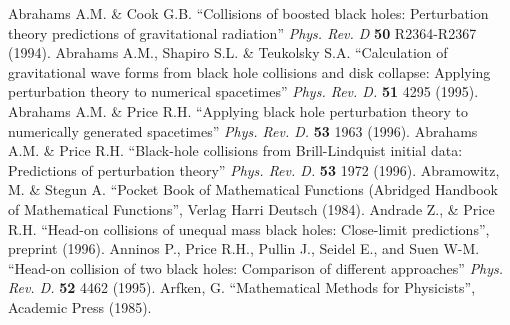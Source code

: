 \begin{thebibliography}{9}
    Abrahams A.M. \& Cook G.B. 
                        ``Collisions of boosted black holes: 
                          Perturbation theory predictions of 
                          gravitational radiation'' 
                        {\em Phys. Rev. D} 
                        {\bf 50} 
                        R2364-R2367 
                        (1994).
    Abrahams A.M., Shapiro S.L. \& Teukolsky S.A.  
                        ``Calculation of gravitational wave forms from 
                          black hole collisions and disk collapse: Applying
                          perturbation theory to numerical spacetimes''
                        {\em Phys. Rev. D.} 
                        {\bf 51}
                        4295
                        (1995).
   Abrahams A.M. \& Price R.H. 
                        ``Applying black hole perturbation
                          theory to numerically generated spacetimes'' 
                        {\em Phys. Rev. D.} 
                        {\bf 53} 
                        1963 
                        (1996).
   Abrahams A.M. \& Price R.H. 
                        ``Black-hole collisions from Brill-Lindquist 
                          initial data: Predictions of perturbation theory'' 
                        {\em Phys. Rev. D.} 
                        {\bf 53} 
                        1972 
                        (1996).
         Abramowitz, M. \& Stegun A. 
                        ``Pocket Book of Mathematical Functions 
                          (Abridged Handbook of Mathematical Functions'', 
                        Verlag Harri Deutsch 
                        (1984).
     Andrade Z., \& Price R.H. 
                        ``Head-on collisions of unequal mass black holes:
                          Close-limit predictions'', 
                        preprint 
                        (1996).
     Anninos P., Price R.H., Pullin J., Seidel E., 
                          and Suen W-M. 
                        ``Head-on collision of two black holes: 
                          Comparison of different approaches''
                        {\em Phys. Rev. D.} 
                        {\bf 52} 
                        4462 
                        (1995).
        Arfken, G. 
                        ``Mathematical Methods for Physicists'', 
                        Academic Press 
                        (1985).

\end{thebibliography}
